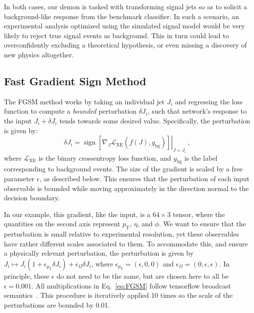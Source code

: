 \documentclass[reprint,nofootinbib,...]{revtex4-1}
\DeclareMathOperator{\sign}{sign}
\newcommand{\nconst}{64}       %
\newcommand{\pt}{p_\mathrm{T}} %
\begin{document}
In both cases, our demon is tasked with transforming signal jets so as to solicit a background-like response from the benchmark classifier.
In such a scenario, an experimental analysis optimized using the simulated signal model would be very likely to reject true signal events as background.
This in turn could lead to overconfidently excluding a theoretical hypothesis, or even missing a discovery of new physics altogether.

\subsection{Fast Gradient Sign Method}
\label{subsec:fgsm}
The FGSM method works by taking an individual jet $J_i$ and regressing the loss function to compute a \textit{bounded} perturbation $\delta J_i$, such that network's response to the input $J_i + \delta J_i$ tends towards some desired value.
Specifically, the perturbation is given by:
\begin{equation}
\label{eq:FGSM}
\delta J_i = \left.\sign\left[\nabla_{J} \mathcal{L}_\text{XE}\left(f(J), y_\mathrm{bg}\right)\right]\right\rvert_{J=J_i} \,,
\end{equation}
where $\mathcal{L}_\text{XE}$ is the binary crossentropy loss function, and $y_\mathrm{bg}$ is the label corresponding to background events.  The size of the gradient is scaled by a free parameter $\epsilon$, as described below.  This ensures that the perturbation of each input observable is bounded while moving approximately in the direction normal to the decision boundary. 

In our example, this gradient, like the input, is a $\nconst\times3$ tensor, where the quantities on the second axis represent $\pt$, $\eta$, and $\phi$.
We want to ensure that the perturbation is small relative to experimental resolution, yet these observables have rather different scales associated to them.
To accommodate this, and ensure a physically relevant perturbation, the perturbation is given by $J_i\mapsto J_i(1+\epsilon_{\pt}\delta J_i)+\epsilon_\Omega\delta J_i$, where $\epsilon_{\pt}=(\epsilon,0,0)$ and $\epsilon_\Omega=(0,\epsilon,\epsilon)$.  In principle, these $\epsilon$ do not need to be the same, but are chosen here to all be $\epsilon=0.001$.   All multiplications in Eq.~\ref{eq:FGSM} follow tensorflow broadcast semantics~\cite{tensorflow}.  This procedure is iteratively applied 10 times so the scale of the perturbations are bounded by 0.01.
\end{document}
